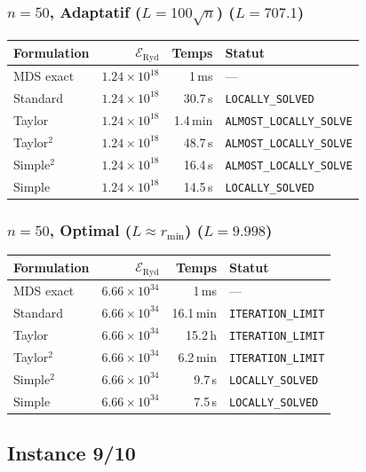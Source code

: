 \subsubsection{$n=50$, Adaptatif ($L{=}100\sqrt{n}$) ($L=707.1$)}
\begin{longtable}{@{}lrrl@{}}
  \toprule
  Formulation & $\mathcal{E}_{\mathrm{Ryd}}$ & Temps & Statut \\
  \midrule
  \endhead
  MDS exact & $1.24\times10^{18}$ & 1\,ms & --- \\
  Standard & $1.24\times10^{18}$ & 30.7\,s & \texttt{LOCALLY\_SOLVED} \\
  Taylor & $1.24\times10^{18}$ & 1.4\,min & \texttt{ALMOST\_LOCALLY\_SOLVE} \\
  Taylor$^2$ & $1.24\times10^{18}$ & 48.7\,s & \texttt{ALMOST\_LOCALLY\_SOLVE} \\
  Simple$^2$ & $1.24\times10^{18}$ & 16.4\,s & \texttt{ALMOST\_LOCALLY\_SOLVE} \\
  Simple & $1.24\times10^{18}$ & 14.5\,s & \texttt{LOCALLY\_SOLVED} \\
  \bottomrule
\end{longtable}

\subsubsection{$n=50$, Optimal ($L{\approx}r_{\min}$) ($L=9.998$)}
\begin{longtable}{@{}lrrl@{}}
  \toprule
  Formulation & $\mathcal{E}_{\mathrm{Ryd}}$ & Temps & Statut \\
  \midrule
  \endhead
  MDS exact & $6.66\times10^{34}$ & 1\,ms & --- \\
  Standard & $6.66\times10^{34}$ & 16.1\,min & \texttt{ITERATION\_LIMIT} \\
  Taylor & $6.66\times10^{34}$ & 15.2\,h & \texttt{ITERATION\_LIMIT} \\
  Taylor$^2$ & $6.66\times10^{34}$ & 6.2\,min & \texttt{ITERATION\_LIMIT} \\
  Simple$^2$ & $6.66\times10^{34}$ & 9.7\,s & \texttt{LOCALLY\_SOLVED} \\
  Simple & $6.66\times10^{34}$ & 7.5\,s & \texttt{LOCALLY\_SOLVED} \\
  \bottomrule
\end{longtable}

\subsection{Instance 9/10}
